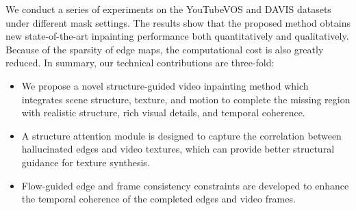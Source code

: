 %
We conduct a series of experiments on the YouTubeVOS and DAVIS datasets under different mask settings. 
The results show that the proposed method obtains new state-of-the-art inpainting performance both quantitatively and qualitatively. 
%
Because of the sparsity of edge maps, the computational cost is also greatly reduced.
%
In summary, our technical contributions are three-fold:
\begin{itemize}
	\item We propose a novel structure-guided video inpainting method which integrates scene structure, texture, and motion to complete the missing region with realistic structure, rich visual details, and temporal coherence.
	\item A structure attention module is designed to capture the correlation between hallucinated edges and video textures, which can provide better structural guidance for texture synthesis. %
	\item Flow-guided edge and frame consistency constraints are developed to enhance the temporal coherence of the completed edges and video frames.   
\end{itemize}




